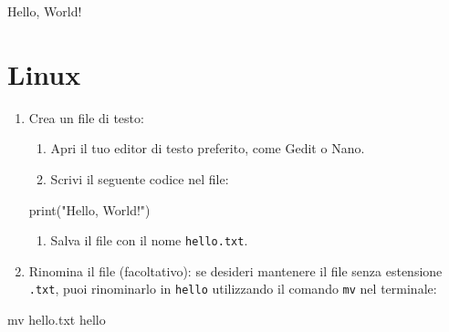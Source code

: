 \documentclass[
  letterpaper,
]{scrbook}
\newenvironment{Shaded}{\begin{snugshade}}{\end{snugshade}}
\newcommand{\BuiltInTok}[1]{\textcolor[rgb]{0.00,0.23,0.31}{#1}}
\newcommand{\ExtensionTok}[1]{\textcolor[rgb]{0.00,0.23,0.31}{#1}}
\newcommand{\FunctionTok}[1]{\textcolor[rgb]{0.28,0.35,0.67}{#1}}
\newcommand{\NormalTok}[1]{\textcolor[rgb]{0.00,0.23,0.31}{#1}}
\newcommand{\StringTok}[1]{\textcolor[rgb]{0.13,0.47,0.30}{#1}}
\providecommand{\tightlist}{%
  \setlength{\itemsep}{0pt}\setlength{\parskip}{0pt}}\usepackage{longtable,booktabs,array}
\begin{document}
\begin{Shaded}
\begin{Highlighting}[]
\ExtensionTok{Hello,}\NormalTok{ World!}
\end{Highlighting}
\end{Shaded}

\section{Linux}

\begin{enumerate}
\def\labelenumi{\arabic{enumi}.}
\item
  Crea un file di testo:

  \begin{enumerate}
  \def\labelenumii{\roman{enumii}.}
  \tightlist
  \item
    Apri il tuo editor di testo preferito, come Gedit o Nano.
  \item
    Scrivi il seguente codice nel file:
  \end{enumerate}

\begin{Shaded}
\begin{Highlighting}[]
\BuiltInTok{print}\NormalTok{(}\StringTok{"Hello, World!"}\NormalTok{)}
\end{Highlighting}
\end{Shaded}

  \begin{enumerate}
  \def\labelenumii{\roman{enumii}.}
  \setcounter{enumii}{2}
  \tightlist
  \item
    Salva il file con il nome \texttt{hello.txt}.
  \end{enumerate}
\item
  Rinomina il file (facoltativo): se desideri mantenere il file senza
  estensione \texttt{.txt}, puoi rinominarlo in \texttt{hello}
  utilizzando il comando \texttt{mv} nel terminale:
\end{enumerate}

\begin{Shaded}
\begin{Highlighting}[]
\FunctionTok{mv}\NormalTok{ hello.txt hello}
\end{Highlighting}
\end{Shaded}
\end{document}

